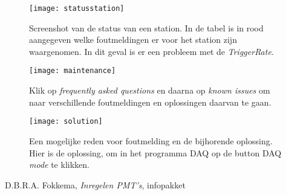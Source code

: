 \begin{figure} 
\centering 
\texttt{[image: statusstation]}
\caption{Screenshot van de status van een station. In de tabel is in rood aangegeven 
welke foutmeldingen er voor het station zijn waargenomen. 
In dit geval is er een probleem met de \emph{TriggerRate}.}\label{fig:statusstation} 
\end{figure}

\begin{figure} 
\centering 
\texttt{[image: maintenance]}
\caption{Klik op \emph{frequently asked questions} en daarna op
         \emph{known issues} om naar verschillende foutmeldingen en
         oplossingen daarvan te gaan.}\label{fig:maintenance} 
\end{figure}
 
\begin{figure} 
\centering 
\texttt{[image: solution]}
\caption{Een mogelijke reden voor foutmelding en de bijhorende
         oplossing. Hier is de oplossing, om in het programma \hisparc
         DAQ op de button DAQ \emph{mode} te klikken.} 
\label{fig:solution} 
\end{figure}


\begin{thebibliography}{9} 	
	 D.B.R.A. Fokkema, \emph{Inregelen PMT's}, infopakket \hisparc 
\end{thebibliography}




